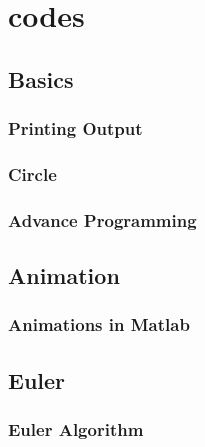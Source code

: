 \documentclass[hyperref={pdfpagelabels=true}]{beamer}
\begin{document}
\section{codes}
\subsection{Basics}

\begin{frame}
\frametitle{Printing Output}
\begin{tcolorbox}[title=,width=9.85 cm]

\end{tcolorbox}
\end{frame}

\begin{frame}
\frametitle{Circle}
\begin{tcolorbox}[title=Drawing Circle in Matlab ,width=9.85 cm]

\end{tcolorbox}
\end{frame}

\begin{frame}
\frametitle{Advance Programming}
\begin{tcolorbox}[title=,width=9.85 cm]

\end{tcolorbox}
\end{frame}

\subsection{Animation}

\begin{frame}
\frametitle{Animations in Matlab}
\begin{tcolorbox}[title= ,width=9.85 cm]

\end{tcolorbox}
\end{frame}

\subsection{Euler}

\begin{frame}
\frametitle{Euler Algorithm}
\scriptsize{
\begin{tcolorbox}[title=Main Function ,width=9.85 cm]

\end{tcolorbox}}
\end{frame}
\end{document}
